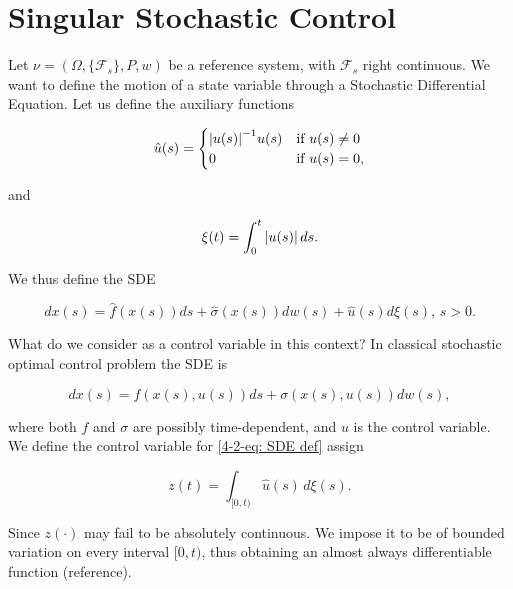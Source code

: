 \section{Singular Stochastic Control}

Let $\nu=(\Omega, \{\mathcal{F}_s\}, P, w)$ be a reference system, with $\mathcal{F}_s$ right continuous. We want to define the motion of a state variable through a Stochastic Differential Equation. 
Let us define the auxiliary functions

\begin{equation}
    \hat{u}(s) = \begin{cases}
        \abs{u(s)}^{-1}u(s) & \text{if } u(s) \neq 0 \\
        0 & \text{if } u(s) = 0,
    \end{cases}
\end{equation}

and

\begin{equation}
    \xi(t) = \int_0^t \abs{u(s)} \,ds.
\end{equation}

We thus define the SDE

\begin{equation}\label{4-2-eq: SDE def}
    dx(s) = \hat{f}(x(s))ds + \hat{\sigma}(x(s))dw(s) + \hat{u}(s)d\xi(s),\,s>0.
\end{equation}

What do we consider as a control variable in this context? In classical stochastic optimal control problem the SDE is

\[dx(s) = f(x(s),u(s))ds + \sigma(x(s),u(s))dw(s),\]

where both $f$ and $\sigma$ are possibly time-dependent, and $u$ is the control variable. We define the control variable for \eqref{4-2-eq: SDE def} assign

\begin{equation}
    z(t) = \int_{[0,t)} \hat{u}(s) \,d\xi(s).
\end{equation}

Since $z(\cdot)$ may fail to be absolutely continuous. We impose it to be of bounded variation on every interval $[0,t)$, thus obtaining an almost always differentiable function (reference).